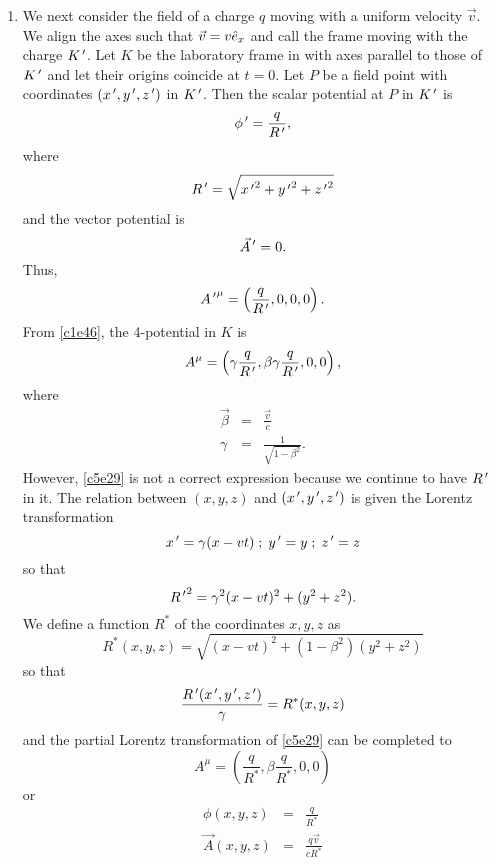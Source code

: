 \begin{enumerate}
\item We next consider the field of a charge $q$ moving with a uniform velocity
$\vec{v}$. We align the axes such that $\vec{v} = v\hat{e}_{x}$ and call the frame
moving with the charge $K^{\,\prime}$. Let $K$ be the laboratory frame in with axes 
parallel to those of $K^{\,\prime}$ and let their origins coincide at $t = 0$. Let $P$
be a field point with coordinates $(x^{\,\prime}, y^{\,\prime}, z^{\,\prime})$ in $K^{\,\prime}$. Then the
scalar potential at $P$ in $K^{\,\prime}$ is
\begin{equation}\label{c5e25}
\phi^{\,\prime} = \frac{q}{R^{\,\prime}},
\end{equation}
where 
\begin{equation}\label{c5e26}
R^{\,\prime} = \sqrt{{x^{\,\prime}}^2 + {y^{\,\prime}}^2 + {z^{\,\prime}}^2}
\end{equation}
and the vector potential is
\begin{equation}\label{c5e27}
\vec{A}^{\,\prime} = 0.
\end{equation}
Thus,
\begin{equation}\label{c5e28}
{A^{\,\prime}}^\mu = \left(\frac{q}{R^{\,\prime}}, 0, 0, 0\right).
\end{equation}
From \eqref{c1e46}, the 4-potential in $K$ is
\begin{equation}\label{c5e29}
A^\mu = \left(\gamma\frac{q}{R^{\,\prime}}, \beta\gamma\frac{q}{R^{\,\prime}}, 0, 0\right),
\end{equation}
where
\begin{eqnarray*}
\vec{\beta} &=& \frac{\vec{v}}{c} \\
\gamma &=& \frac{1}{\sqrt{1 - \beta^2}}.
\end{eqnarray*}
However, \eqref{c5e29} is not a correct expression because we continue to have
$R^{\,\prime}$ in it. The relation between $(x, y, z)$ and $(x^{\,\prime}, y^{\,\prime}, z^{\,\prime})$ is
given the Lorentz transformation
\[
x^{\,\prime} = \gamma(x - vt) \;;\; y^{\,\prime} = y \;;\; z^{\,\prime} = z
\]
so that
\begin{equation}\label{c5e30}
{R^{\,\prime}}^2 = \gamma^2(x - vt)^2 + (y^2 + z^2).
\end{equation}
We define a function $R^\ast$ of the coordinates $x, y, z$ as
\begin{equation}\label{c5e31}
R^\ast(x, y, z) = \sqrt{(x - vt)^2 + (1 - \beta^2)(y^2 + z^2)}
\end{equation}
so that
\begin{equation}\label{c5e32}
\frac{R^{\,\prime}(x^{\,\prime}, y^{\,\prime}, z^{\,\prime})}{\gamma} = R^\ast(x, y, z)
\end{equation}
and the partial Lorentz transformation of \eqref{c5e29} can be completed to
\begin{equation}\label{c5e33}
A^\mu = \left(\frac{q}{R^\ast}, \beta\frac{q}{R^\ast}, 0, 0\right)
\end{equation}
or
\begin{eqnarray}
\phi(x, y, z) &=& \frac{q}{R^\ast} \label{c5e34} \\
\vec{A}(x, y, z) &=& \frac{q\vec{v}}{cR^\ast} \label{c5e35}
\end{eqnarray}


\end{enumerate}
